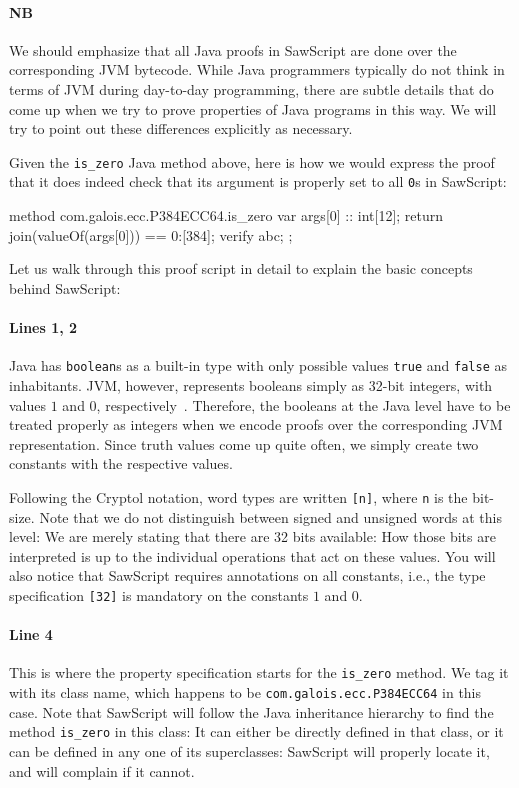 \documentclass[12pt]{galois-whitepaper}
\newcommand{\sawScript}{{\sc SawScript}\xspace}
\begin{document}
\paragraph{NB} We should emphasize that all Java proofs in \sawScript are done over the corresponding JVM bytecode. While Java programmers
typically do not think in terms of JVM during day-to-day programming, there are subtle details that do come up when
we try to prove properties of Java programs in this way. We will try to point out these differences explicitly as necessary.

Given the {\tt is\_zero} Java method above, here is how we would express the proof that it does indeed check that
its argument is properly set to all {\tt 0}s in \sawScript:

\begin{code}[numbers=left]
  method com.galois.ecc.P384ECC64.is_zero {
    var args[0] :: int[12];
    return join(valueOf(args[0])) == 0:[384];
    verify abc;
  };
\end{code}
Let us walk through this proof script in detail to explain the basic concepts behind \sawScript:

\paragraph{Lines 1, 2} Java has {\tt boolean}s as a built-in type with only possible values {\tt true} and {\tt false}
as inhabitants. JVM, however,
represents booleans simply as 32-bit integers, with values $1$ and $0$, respectively~\cite[Section 3.3.4]{Lindholm:1999:JVM:553607}.
Therefore, the booleans at the Java level have to be treated properly as integers when we encode proofs over the corresponding JVM
representation.  Since truth values come up quite often, we simply create two constants with the respective values. 

Following the Cryptol notation, word types are written {\tt [n]}, where {\tt n}
is the bit-size. Note that we do not distinguish between signed and unsigned words at this level: We are merely stating that there are 32
bits available: How those bits are interpreted is up to the individual operations that act on these values. You will also notice that
\sawScript requires annotations on all constants, i.e., the type specification {\tt [32]} is mandatory on the constants $1$ and $0$.

\paragraph{Line 4} This is where the property specification starts for the {\tt is\_zero} method. We tag it with its class name,
which happens to be {\tt com.galois.ecc.P384ECC64} in this case. Note that \sawScript will follow the Java inheritance hierarchy
to find the method {\tt is\_zero} in this class: It can either be directly defined in that class, or it can be defined in any one
of its superclasses: \sawScript will properly locate it, and will complain if it cannot.
\end{document}
